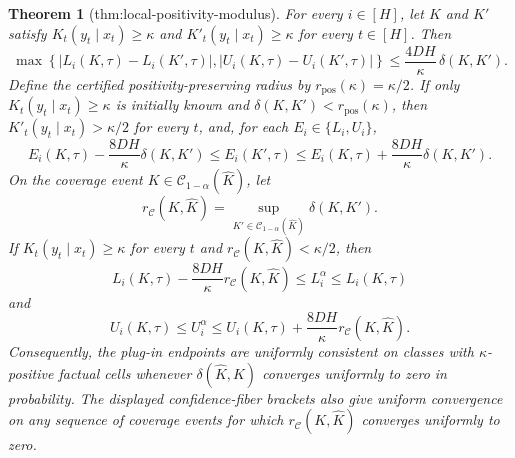 \documentclass{article}
\newtheorem{theorem}{Theorem}
\begin{document}
\begin{theorem}[thm:local-positivity-modulus]\label{thm:local-positivity-modulus}
For every \(i\in[H]\), let \(K\) and \(K'\) satisfy \(K_t(y_t\mid x_t)\ge\kappa\) and \(K'_t(y_t\mid x_t)\ge\kappa\) for every \(t\in[H]\). Then
\[
 \max\!\left\{|L_i(K,\tau)-L_i(K',\tau)|,
                 |U_i(K,\tau)-U_i(K',\tau)|\right\}
 \le \frac{4DH}{\kappa}\,\delta(K,K').
\]
Define the certified positivity-preserving radius by \(r_{\mathrm{pos}}(\kappa)=\kappa/2\). If only \(K_t(y_t\mid x_t)\ge\kappa\) is initially known and \(\delta(K,K')<r_{\mathrm{pos}}(\kappa)\), then \(K'_t(y_t\mid x_t)>\kappa/2\) for every \(t\), and, for each \(E_i\in\{L_i,U_i\}\),
\[
 E_i(K,\tau)-\frac{8DH}{\kappa}\delta(K,K')
 \le E_i(K',\tau)
 \le E_i(K,\tau)+\frac{8DH}{\kappa}\delta(K,K').
\]
On the coverage event \(K\in\mathcal C_{1-\alpha}(\widehat K)\), let
\[
 r_{\mathcal C}(K,\widehat K)
 =\sup_{K'\in\mathcal C_{1-\alpha}(\widehat K)}\delta(K,K').
\]
If \(K_t(y_t\mid x_t)\ge\kappa\) for every \(t\) and \(r_{\mathcal C}(K,\widehat K)<\kappa/2\), then
\[
 L_i(K,\tau)-\frac{8DH}{\kappa}r_{\mathcal C}(K,\widehat K)
 \le L_i^{\alpha}\le L_i(K,\tau)
\]
and
\[
 U_i(K,\tau)
 \le U_i^{\alpha}
 \le U_i(K,\tau)+\frac{8DH}{\kappa}r_{\mathcal C}(K,\widehat K).
\]
Consequently, the plug-in endpoints are uniformly consistent on classes with \(\kappa\)-positive factual cells whenever \(\delta(\widehat K,K)\) converges uniformly to zero in probability. The displayed confidence-fiber brackets also give uniform convergence on any sequence of coverage events for which \(r_{\mathcal C}(K,\widehat K)\) converges uniformly to zero.
\end{theorem}
\end{document}
